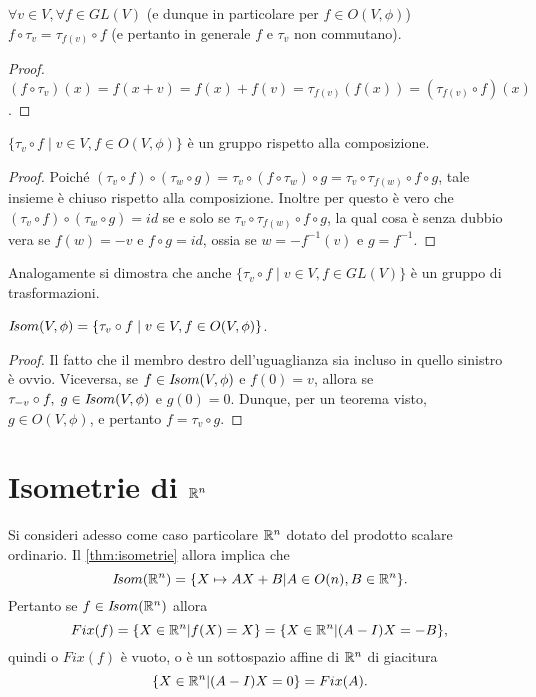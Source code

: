  \begin{lemma}
 $\forall v\in V, \forall f\in GL(V)$ (e dunque in particolare per 
 $f\in O(V,\phi)$) $f\circ\tau_v=\tau_{f(v)}\circ f$ (e pertanto in generale $f$ e $\tau_v$ non commutano).
 \end{lemma}
 
 \begin{proof}
 $(f\circ\tau_v)(x)=f(x+v)=f(x)+f(v)=\tau_{f(v)}(f(x))=(\tau_{f(v)}\circ f)(x)$.
  \end{proof}
 
 \begin{proposition}
 $\{\tau_v\circ f\;|\;v\in V,f\in O(V,\phi)\}$ è un gruppo rispetto alla composizione.
 \end{proposition}
 
 \begin{proof}
 Poiché  $(\tau_v\circ f)\circ(\tau_w\circ g)=\tau_v\circ(f\circ\tau_w)\circ g=
 \tau_v\circ\tau_{f(w)}\circ f\circ g$, tale insieme è chiuso rispetto alla composizione.
 Inoltre per questo è vero che $(\tau_v\circ f)\circ(\tau_w\circ g)=id$ se e solo se $\tau_v\circ\tau_{f(w)}\circ f\circ g$,
 la qual cosa è senza dubbio vera se $f(w)=-v$  e  $f\circ g=id$, ossia se $w=-f^{-1}(v)$  e 
 $g=f^{-1}$.
  \end{proof}
 
 \begin{remark}\label{oss:gruppoaff}
 Analogamente si dimostra che anche $\{\tau_v\circ f\;|\;v\in V,f\in GL(V)\}$ 
 è un gruppo di trasformazioni.
 \end{remark}
 
 \begin{theorem}
 \label{thm:isometrie}
 $I\!som( V,\phi)=\{\tau_v\circ f\;|\;v\in V,f\in O(V,\phi)\}$.
 \end{theorem}
 
 \begin{proof}
 Il fatto che il membro destro dell'uguaglianza sia incluso in quello sinistro è ovvio.
 Viceversa, se $f\in I\!som( V,\phi)$  e  $f(0)=v$, allora se  $\tau_{-v}\circ f,\; g\in I\!som( V,\phi)$ e
 $g(0)=0$. Dunque, per un teorema visto, $g\in O(V,\phi)$, e pertanto $f=\tau_v\circ g$.
  \end{proof}
 

 
\section{Isometrie di $\mathbb R^n$}
 
 Si consideri adesso come caso particolare $\mathbb R^n$ dotato del prodotto scalare ordinario.
 Il \cref{thm:isometrie} allora implica che
 \[
	I\!som( \mathbb R^n)=\{X\mapsto AX+B|A\in O(n),B\in \mathbb R^n\}.
 \]
 Pertanto se $f\in I\!som( \mathbb R^n)$ allora
 \[
	Fix(f)=\{X\in \mathbb R^n|f(X)=X\}=\{X\in \mathbb R^n|(A-I)X=-B\},
 \]
 quindi o $Fix(f)$ è vuoto, o è un sottospazio affine di $\mathbb R^n$ di giacitura
 \[
	\{X\in \mathbb R^n|(A-I)X=0\}=Fix(A).
 \]
 
